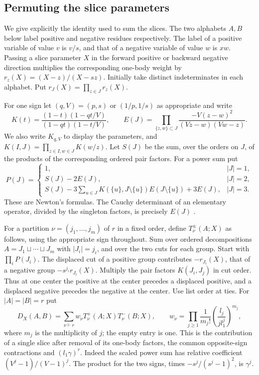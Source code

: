 \subsection{Permuting the slice parameters}
We give explicitly the identity used to sum the slices. The two
alphabets $A,B$ below label positive and negative residues respectively.
The label of a positive variable of value $v$ is $v/s$, and that of
a negative variable of value $w$ is $xw$. Passing a slice parameter $X$
in the forward positive or backward negative direction multiplies
the corresponding one-body weight by
$r_z(X)=(X-z)/(X-sz)$. Initially take distinct indeterminates in each
alphabet. Put $r_J(X)=\prod_{z\in J}r_z(X)$.

For one sign let $(q,V)=(p,s)$ or $(1/p,1/s)$ as appropriate and write
\[
 K(t)=\frac{(1-t)(1-qt/V)}{(1-qt)(1-t/V)},\qquad
 E(J)=\prod_{\{z,w\}\subset J}
       \frac{-V(z-w)^2}{(Vz-w)(Vw-z)} .
\]
We also write $K_{q,V}$ to display the parameters, and
$K(I,J)=\prod_{z\in I,w\in J}K(w/z)$. Let $S(J)$ be the sum, over
the orders on $J$, of the products of the corresponding ordered pair
factors. For a power sum put
\[
 P(J)=
 \begin{cases}
 1,&|J|=1,\\
 S(J)-2E(J),&|J|=2,\\
 S(J)-3\sum_{u\in J}K(\{u\},J\setminus\{u\})E(J\setminus\{u\})+3E(J),
   &|J|=3 .
 \end{cases}
\]
These are Newton's formulas. The Cauchy determinant of an elementary
operator, divided by the singleton factors, is precisely $E(J)$
\cite[Props.~2.6--2.7]{Ko}.

For a partition $\nu=(j_1,\ldots,j_m)$ of $r$ in a fixed order, define
$T^\pm_\nu(A;X)$ as follows, using the appropriate sign throughout.
Sum over ordered decompositions $A=J_1\sqcup\cdots\sqcup J_m$ with
$|J_i|=j_i$, and over the two cuts for each group. Start with
$\prod_iP(J_i)$. The displaced cut of a positive group contributes
$-r_{J_i}(X)$, that of a negative group $-s^{j_i}r_{J_i}(X)$.
Multiply the pair factors $K(J_i,J_j)$ in cut order. Thus at one
center the positive at the center precedes a displaced positive, and
a displaced negative precedes the negative at the center. Use list
order at ties. For $|A|=|B|=r$ put
\begin{equation}\label{eq:cubic-density}
 D_X(A,B)=\sum_{\nu\vdash r} w_\nu T^+_\nu(A;X)T^-_\nu(B;X),
 \qquad w_\nu=\prod_{j\ge1}\frac{1}{m_j!}
              \left(\frac{l_j}{j l_1^j}\right)^{m_j},
\end{equation}
where $m_j$ is the multiplicity of $j$; the empty entry is one.
This is the contribution of a single slice after removal of its
one-body factors, the common opposite-sign contractions and
$(l_1\gamma)^r$. Indeed the scaled power sum has relative coefficient
$(V^j-1)/(V-1)^j$. The product for the two signs, times
$-s^j/(s^j-1)^2$, is $\gamma^j$.

